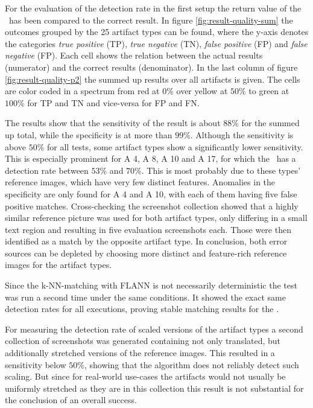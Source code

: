 For the evaluation of the detection rate in the first setup the return value of the \vd~has been compared to the correct result. In figure \ref{fig:result-quality-sum} the outcomes grouped by the 25 artifact types can be found, where the y-axis denotes the categories \emph{true positive} (TP), \emph{true negative} (TN), \emph{false positive} (FP) and \emph{false negative} (FP). Each cell shows the relation between the actual results (numerator) and the correct results (denominator). In the last column of figure \ref{fig:result-quality-p2} the summed up results over all artifacts is given. The cells are color coded in a spectrum from red at $0\%$ over yellow at $50\%$ to green at $100\%$ for TP and TN and vice-versa for FP and FN.

The results show that the sensitivity of the result is about $88\%$ for the summed up total, while the specificity is at more than $99\%$. Although the sensitivity is above $50\%$ for all tests, some artifact types show a significantly lower sensitivity. This is especially prominent for A 4, A 8, A 10 and A 17, for which the \vd~has a detection rate between $53\%$ and $70\%$. This is most probably due to these types' reference images, which have very few distinct features. Anomalies in the specificity are only found for A 4 and A 10, with each of them having five false positive matches. Cross-checking the screenshot collection showed that a highly similar reference picture was used for both artifact types, only differing in a small text region and resulting in five evaluation screenshots each. Those were then identified as a match by the opposite artifact type. In conclusion, both error sources can be depleted by choosing more distinct and feature-rich reference images for the artifact types.

Since the k-NN-matching with FLANN is not necessarily deterministic the test was run a second time under the same conditions. It showed the exact same detection rates for all executions, proving stable matching results for the \vd. \cite{flann}

For measuring the detection rate of scaled versions of the artifact types a second collection of screenshots was generated containing not only translated, but additionally stretched versions of the reference images. This resulted in a sensitivity below $50\%$, showing that the algorithm does not reliably detect such scaling. But since for real-world use-cases the artifacts would not usually be uniformly stretched as they are in this collection this result is not substantial for the conclusion of an overall success.

